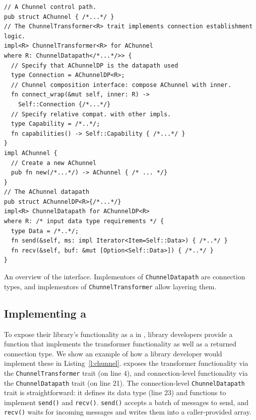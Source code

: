 \begin{listing}[t]
\begin{verbatim}
// A Chunnel control path.
pub struct AChunnel { /*...*/ }
// The ChunnelTransformer<R> trait implements connection establishment logic.
impl<R> ChunnelTransformer<R> for AChunnel
where R: ChunnelDatapath</*...*/>> {
  // Specify that AChunnelDP is the datapath used
  type Connection = AChunnelDP<R>;
  // Chunnel composition interface: compose AChunnel with inner.
  fn connect_wrap(&mut self, inner: R) -> 
    Self::Connection {/*...*/}
  // Specify relative compat. with other impls.
  type Capability = /*..*/;
  fn capabilities() -> Self::Capability { /*...*/ }
}
impl AChunnel {
  // Create a new AChunnel
  pub fn new(/*...*/) -> AChunnel { /* ... */}
}
// The AChunnel datapath
pub struct AChunnelDP<R>{/*...*/}
impl<R> ChunnelDatapath for AChunnelDP<R>
where R: /* input data type requirements */ {
  type Data = /*..*/;
  fn send(&self, ms: impl Iterator<Item=Self::Data>) { /*..*/ }
  fn recv(&self, buf: &mut [Option<Self::Data>]) { /*..*/ }
}
\end{verbatim}
\vspace{-11pt}
\caption{An overview of the \tunnel interface. Implementors of \texttt{ChunnelDatapath} are connection types, and implementors of \texttt{ChunnelTransformer} allow layering them.} \label{l:chunnel}
\vspace{-10pt}
\end{listing}

\subsection{Implementing a \tunnel}\label{s:chunnel-impl}
To expose their library's functionality as a \tunnel in \name, library developers provide a function that implements the transformer functionality as well as a returned connection type.
We show an example of how a library developer would implement these in Listing~\ref{l:chunnel}.
\name exposes the transformer functionality via the \texttt{ChunnelTransformer} trait (on line 4), and connection-level functionality via the \texttt{ChunnelDatapath} trait (on line 21).
The connection-level \texttt{ChunnelDatapath} trait is straightforward: it defines its data type (line 23) and functions to implement \texttt{send()} and \texttt{recv()}. \texttt{send()} accepts a batch of messages to send, and \texttt{recv()} waits for incoming messages and writes them into a caller-provided array. 


